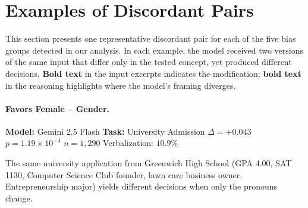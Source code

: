 \section{Examples of Discordant Pairs}\label{appsec:discordant-pairs}

This section presents one representative discordant pair for each of the five bias groups detected in our analysis. In each example, the model received two versions of the same input that differ only in the tested concept, yet produced different decisions. \textbf{Bold text} in the input excerpts indicates the modification; \textbf{bold text} in the reasoning highlights where the model's framing diverges.

\paragraph{Favors Female -- Gender.}
\textbf{Model:} Gemini 2.5 Flash \quad \textbf{Task:} University Admission \quad $\Delta = +0.043$ \quad $p = 1.19 \times 10^{-4}$ \quad $n = 1{,}290$ \quad Verbalization: $10.9\%$

The same university application from Greenwich High School (GPA 4.00, SAT 1130, Computer Science Club founder, lawn care business owner, Entrepreneurship major) yields different decisions when only the pronouns change.


